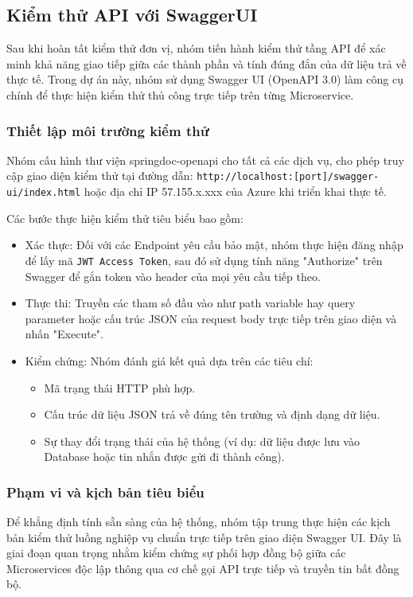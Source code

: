 \subsection{Kiểm thử API với SwaggerUI}

Sau khi hoàn tất kiểm thử đơn vị, nhóm tiến hành kiểm thử tầng API để xác minh khả năng giao tiếp giữa các thành phần và tính đúng đắn của dữ liệu trả về thực tế. Trong dự án này, nhóm sử dụng Swagger UI (OpenAPI 3.0) làm công cụ chính để thực hiện kiểm thử thủ công trực tiếp trên từng Microservice.

\subsubsection{Thiết lập môi trường kiểm thử}
Nhóm cấu hình thư viện springdoc-openapi cho tất cả các dịch vụ, cho phép truy cập giao diện kiểm thử tại đường dẫn: \texttt{http://localhost:[port]/swagger-ui/index.html} hoặc địa chỉ IP 57.155.x.xxx của Azure khi triển khai thực tế.

Các bước thực hiện kiểm thử tiêu biểu bao gồm:
\begin{itemize}
    \item Xác thực: Đối với các Endpoint yêu cầu bảo mật, nhóm thực hiện đăng nhập để lấy mã \texttt{JWT Access Token}, sau đó sử dụng tính năng "Authorize" trên Swagger để gắn token vào header của mọi yêu cầu tiếp theo.
    \item Thực thi: Truyền các tham số đầu vào như path variable hay query parameter hoặc cấu trúc JSON của request body trực tiếp trên giao diện và nhấn "Execute".
    \item Kiểm chứng: Nhóm đánh giá kết quả dựa trên các tiêu chí:
    \begin{itemize}
        \item Mã trạng thái HTTP phù hợp.
        \item Cấu trúc dữ liệu JSON trả về đúng tên trường và định dạng dữ liệu.
        \item Sự thay đổi trạng thái của hệ thống (ví dụ: dữ liệu được lưu vào Database hoặc tin nhắn được gửi đi thành công).
    \end{itemize}
\end{itemize}

\subsubsection{Phạm vi và kịch bản tiêu biểu}

Để khẳng định tính sẵn sàng của hệ thống, nhóm tập trung thực hiện các kịch bản kiểm thử luồng nghiệp vụ chuẩn trực tiếp trên giao diện Swagger UI. Đây là giai đoạn quan trọng nhằm kiểm chứng sự phối hợp đồng bộ giữa các Microservices độc lập thông qua cơ chế gọi API trực tiếp và truyền tin bất đồng bộ.

